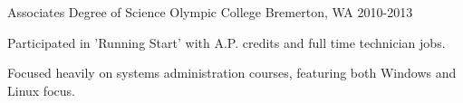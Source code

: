 


\begin{cventries}


\cventry
{Associates Degree of Science} %
{Olympic College} %
{Bremerton, WA} %
{2010-2013} %
{ %
\begin{cvitems}
\item {Participated in 'Running Start' with A.P. credits and full time technician jobs.}
\item {Focused heavily on systems administration courses, featuring both Windows and Linux focus.}
\end{cvitems}
}


\end{cventries}